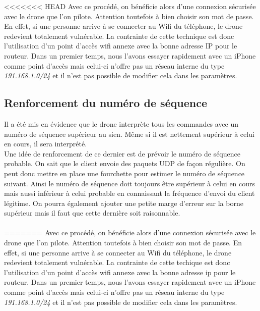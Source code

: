 <<<<<<< HEAD
Avec ce procédé, on bénéficie alors d'une connexion sécurisée avec le drone que l'on pilote. Attention toutefois à bien choisir son mot de passe. En effet, si une personne arrive à se connecter au Wifi du téléphone, le drone redevient totalement vulnérable. La contrainte de cette technique est donc l'utilisation d'un point d'accès wifi annexe avec la bonne adresse IP pour le routeur. Dans un premier temps, nous l'avons essayer rapidement avec un iPhone comme point d'accès mais celui-ci n'offre pas un réseau interne du type \textit{191.168.1.0/24} et il n'est pas possible de modifier cela dans les paramètres.

\subsection{Renforcement du numéro de séquence}
Il a été mis en évidence que le drone interprète tous les commandes avec un numéro de séquence supérieur au sien. Même si il est nettement supérieur à celui en cours, il sera interprété.\\
Une idée de renforcement de ce dernier est de prévoir le numéro de séquence probable. On sait que le client envoie des paquets UDP de façon régulière. On peut donc mettre en place une fourchette pour estimer le numéro de séquence suivant. Ainsi le numéro de séquence doit toujours être supérieur à celui en cours mais aussi inférieur à celui probable en connaissant la fréquence d’envoi du client légitime. On pourra également ajouter une petite marge d'erreur sur la borne supérieur mais il faut que cette dernière soit raisonnable.\\\\
=======
Avec ce procédé, on bénéficie alors d'une connexion sécurisée avec le drone que l'on pilote. Attention toutefois à bien choisir son mot de passe. En effet, si une personne arrive à se connecter au Wifi du téléphone, le drone redevient totalement vulnérable. La contrainte de cette techique est donc l'utilisation d'un point d'accès wifi annexe avec la bonne adresse ip pour le routeur. Dans un premier temps, nous l'avons essayer rapidement avec un iPhone comme point d'accès mais celui-ci n'offre pas un réseau interne du type \textit{191.168.1.0/24} et il n'est pas possible de modifier cela dans les paramètres.

